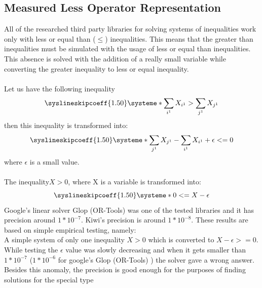 \documentclass{article}
\begin{document}
	\subsection{Measured Less Operator Representation}
	All of the researched third party libraries for solving systems of inequalities work only with less or equal than ($\leq$) inequalities.
		This means that the greater than inequalities must be simulated with the usage of less or equal than inequalities.
		\newline
		This absence is solved with the addition of a really
		small variable while converting the greater inequality to 
		less or equal inequality.
		\\
		\\
		Let us have the following inequality
		\[
			\syslineskipcoeff{1.50}
			\systeme*{\sum_{i^1} X_{i^1} > \sum_{j^1} X_{j^1}}
		\]
		then this inequality is transformed into:
		\[
			\syslineskipcoeff{1.50}
			\systeme*{\sum_{j^1} X_{j^1} - \sum_{i^1} X_{i^1} + \epsilon <= 0}
		\]
		where $\epsilon$ is a small value.
		\\
		\\
		The inequality$ X > 0 $, where X is a variable is transformed into:
		\[
			\syslineskipcoeff{1.50}
			\systeme*{0 <= X - \epsilon} 
		\]
		\newline
		Google's linear solver Glop (OR-Tools) was one of the tested libraries and it has precision around $1*10^{-7}$.
		Kiwi's precision is around $1*10^{-8}$. 
		\newline
		\newline
		These results are based on simple empirical testing, namely:
		\\
		\noindent
		A simple system of only one inequality $X > 0$ which is converted to $X - \epsilon >= 0$. 
		While testing the $\epsilon$ value was slowly decreasing and when it gets smaller than $1*10^{-7}$
		($1*10^{-6}$ for google's Glop (OR-Tools) ) the solver gave a wrong answer.
		\newline
		\newline
		Besides this anomaly, the precision is good enough for the purposes of finding solutions for the special type
\end{document}
